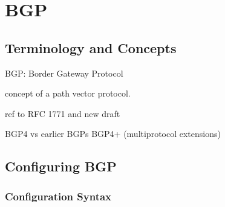 \chapter{BGP}

\section{Terminology and Concepts}

BGP: Border Gateway Protocol

concept of a path vector protocol.

ref to RFC 1771 and new draft

BGP4 vs earlier BGPs
BGP4+ (multiprotocol extensions)

\section{Configuring BGP}

\subsection{Configuration Syntax}


